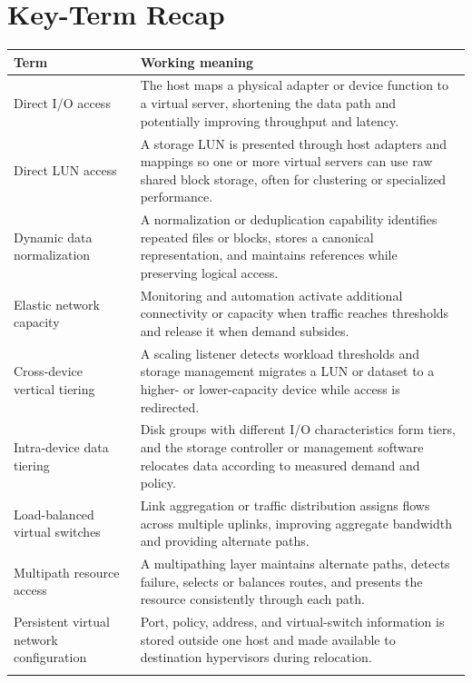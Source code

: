 \documentclass[11pt]{article}
\begin{document}
\section{Key-Term Recap}
\begin{longtable}{@{}>{\RaggedRight\arraybackslash}p{}>{\RaggedRight\arraybackslash}p{}@{}}
\toprule\rowcolor{Navy}\color{white}\textbf{Term} & \color{white}\textbf{Working meaning}\\\midrule\endhead
Direct I/O access & The host maps a physical adapter or device function to a virtual server, shortening the data path and potentially improving throughput and latency. \\\addlinespace[2pt]
Direct LUN access & A storage LUN is presented through host adapters and mappings so one or more virtual servers can use raw shared block storage, often for clustering or specialized performance. \\\addlinespace[2pt]
Dynamic data normalization & A normalization or deduplication capability identifies repeated files or blocks, stores a canonical representation, and maintains references while preserving logical access. \\\addlinespace[2pt]
Elastic network capacity & Monitoring and automation activate additional connectivity or capacity when traffic reaches thresholds and release it when demand subsides. \\\addlinespace[2pt]
Cross-device vertical tiering & A scaling listener detects workload thresholds and storage management migrates a LUN or dataset to a higher- or lower-capacity device while access is redirected. \\\addlinespace[2pt]
Intra-device data tiering & Disk groups with different I/O characteristics form tiers, and the storage controller or management software relocates data according to measured demand and policy. \\\addlinespace[2pt]
Load-balanced virtual switches & Link aggregation or traffic distribution assigns flows across multiple uplinks, improving aggregate bandwidth and providing alternate paths. \\\addlinespace[2pt]
Multipath resource access & A multipathing layer maintains alternate paths, detects failure, selects or balances routes, and presents the resource consistently through each path. \\\addlinespace[2pt]
Persistent virtual network configuration & Port, policy, address, and virtual-switch information is stored outside one host and made available to destination hypervisors during relocation. \\\addlinespace[2pt]

\end{longtable}
\end{document}
